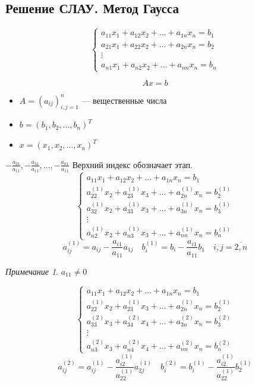 \documentclass[oneside]{book}
\theoremstyle{plain}
\theoremstyle{remark}
\newtheorem*{remark}{Примечание}
\theoremstyle{definition}
\begin{document}
\subsection{Решение СЛАУ. Метод Гаусса}
\label{sec:org97d20f7}
\[ \begin{cases}
a_{11}x_1 + a_{12} x_2 + \dots + a_{1n}x_n = b_1 \\
a_{21}x_1 + a_{22} x_2 + \dots + a_{2n}x_n = b_2 \\
\vdots \\
a_{n1}x_1 + a_{n2} x_2 + \dots + a_{nn}x_n = b_n
\end{cases} \]

\[ Ax = b \]
\begin{itemize}
\item \(A = (a_{ij})_{i,j = 1}^n\) --- вещественные числа
\item \(b = (b_1, b_2, \dots, b_n)^T\)
\item \(x = (x_1, x_2, \dots, x_n)^T\)
\end{itemize}
\(-\frac{a_{21}}{a_{11}}, -\frac{a_{31}}{a_{11}}, \dots, -\frac{a_{n1}}{a_{11}}\)
Верхний индекс обозначает этап.
\[ \begin{cases}
a_{11}x_1 + a_{12} x_2 + \dots + a_{1n}x_n = b_1 \\
a_{22}^{(1)}x_2 + a_{23}^{(1)}x_3 + \dots + a_{2n}^{(1)}x_n = b_2^{(1)} \\
a_{32}^{(1)}x_2 + a_{33}^{(1)}x_3 + \dots + a_{3n}^{(1)}x_n = b_3^{(1)} \\
\vdots \\
a_{n2}^{(1)}x_2 + a_{n3}^{(1)}x_3 + \dots + a_{nn}^{(1)}x_n = b_n^{(1)}
\end{cases} \]
\[ a_{ij}^{(1)} = a_{ij} - \frac{a_{i1}}{a_{11}}a_{1j} \quad b_i^{(1)} = b_i - \frac{a_{i1}}{a_{11}}b_1 \quad i,j = \overline{2, n}\]
\begin{remark}
\(a_{11} \neq 0\)
\end{remark}

\[ \begin{cases}
a_{11}x_1 + a_{12} x_2 + \dots + a_{1n}x_n = b_1 \\
a_{22}^{(1)}x_2 + a_{23}^{(1)}x_3 + \dots + a_{2n}^{(1)}x_n = b_2^{(1)} \\
a_{33}^{(2)}x_3 + a_{34}^{(2)}x_4 + \dots + a_{3n}^{(2)}x_n = b_3^{(2)} \\
\vdots \\
a_{n3}^{(2)}x_3 + a_{n4}^{(2)}x_4 + \dots + a_{nn}^{(2)}x_n = b_n^{(2)}
\end{cases} \]
\[ a_{ij}^{(2)} = a_{ij}^{(1)} - \frac{a_{i2}^{(1)}}{a_{22}^{(1)}}a_{2j}^{(1)} \quad b_i^{(2)} = b_i^{(1)} - \frac{a_{i2}^{(1)}}{a_{22}^{(1)}}b_2^{(1)} \]
\end{document}
